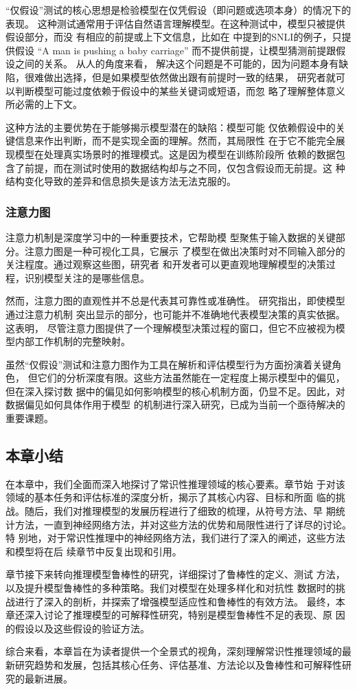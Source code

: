 ``仅假设''测试的核心思想是检验模型在仅凭假设（即问题或选项本身）的情况下的表现。
这种测试通常用于评估自然语言理解模型。在这种测试中，模型只被提供假设部分，而没
有相应的前提或上下文信息，比如在  中提到的SNLI的例子，只提供假设
``A man is pushing a baby carriage'' 而不提供前提，让模型猜测前提跟假设之间的关系。
从人的角度来看，
解决这个问题是不可能的，因为问题本身有缺陷，很难做出选择，但是如果模型依然做出跟有前提时一致的结果，
研究者就可以判断模型可能过度依赖于假设中的某些关键词或短语，而忽
略了理解整体意义所必需的上下文。

这种方法的主要优势在于能够揭示模型潜在的缺陷：模型可能
仅依赖假设中的关键信息来作出判断，而不是实现全面的理解。然而，其局限性
在于它不能完全展现模型在处理真实场景时的推理模式。这是因为模型在训练阶段所
依赖的数据包含了前提，而在测试时使用的数据结构却与之不同，仅包含假设而无前提。这
种结构变化导致的差异和信息损失是该方法无法克服的。

\subsubsection*{注意力图}

注意力机制是深度学习中的一种重要技术，它帮助模
型聚焦于输入数据的关键部分。注意力图是一种可视化工具，它展示
了模型在做出决策时对不同输入部分的关注程度。通过观察这些图，研究者
和开发者可以更直观地理解模型的决策过程，识别模型关注的是哪些信息。

然而，注意力图的直观性并不总是代表其可靠性或准确性。
研究\cite{jain2019attention}指出，即使模型通过注意力机制
突出显示的部分，也可能并不准确地代表模型决策的真实依据。这表明，
尽管注意力图提供了一个理解模型决策过程的窗口，但它不应被视为模
型内部工作机制的完整映射。

虽然``仅假设''测试和注意力图作为工具在解析和评估模型行为方面扮演着关键角色，
但它们的分析深度有限。这些方法虽然能在一定程度上揭示模型中的偏见，但在深入探讨数
据中的偏见如何影响模型的核心机制方面，仍显不足。因此，对数据偏见如何具体作用于模型
的机制进行深入研究，已成为当前一个亟待解决的重要课题。



\subsection{本章小结}

在本章中，我们全面而深入地探讨了常识性推理领域的核心要素。章节始
于对该领域的基本任务和评估标准的深度分析，揭示了其核心内容、目标和所面
临的挑战。随后，我们对推理模型的发展历程进行了细致的梳理，从符号方法、早
期统计方法，一直到神经网络方法，并对这些方法的优势和局限性进行了详尽的讨论。特
别地，对于常识性推理中的神经网络方法，我们进行了深入的阐述，这些方法和模型将在后
续章节中反复出现和引用。

章节接下来转向推理模型鲁棒性的研究，详细探讨了鲁棒性的定义、测试
方法，以及提升模型鲁棒性的多种策略。我们对模型在处理多样化和对抗性
数据时的挑战进行了深入的剖析，并探索了增强模型适应性和鲁棒性的有效方法。
最终，本章还深入讨论了推理模型的可解释性研究，特别是模型鲁棒性不足的表现、原
因的假设以及这些假设的验证方法。

综合来看，本章旨在为读者提供一个全景式的视角，深刻理解常识性推理领域的最
新研究趋势和发展，包括其核心任务、评估基准、方法论以及鲁棒性和可解释性研究的最新进展。

\newpage
\null
\newpage